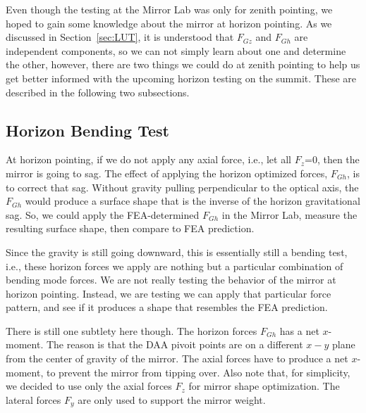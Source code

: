\documentclass [twoside,openbib,12pt]{article}
\begin{document}
Even though the testing at the Mirror Lab was only for zenith
pointing, we hoped to gain some knowledge about the mirror at horizon
pointing. As we discussed in Section~\ref{sec:LUT}, it is understood
that $F_{Gz}$ and $F_{Gh}$ are independent components, so we can not
simply learn about one and determine the other, however, there are two
things we could do at zenith pointing to help us get better informed
with the upcoming horizon testing on the summit. These are described in the
following two subsections.

\subsection{Horizon Bending Test}

 At horizon pointing, if we do not apply any axial force, i.e., let
 all $F_z$=0, then the mirror is going to sag.
The effect of applying the horizon optimized forces, $F_{Gh}$, is to
correct that sag. Without gravity pulling perpendicular to the optical
axis, the $F_{Gh}$ would produce a surface shape that is the inverse
of the horizon gravitational sag. So, we could apply the
FEA-determined $F_{Gh}$ in the Mirror Lab, measure the resulting
surface shape, then compare to FEA prediction.

Since the gravity is still going downward, this is essentially still a
bending test, i.e., these horizon forces we apply are nothing but a
particular combination of bending mode forces. We are not really
testing the behavior of the mirror at horizon pointing. Instead, we
are testing we can apply that particular force pattern, and see if it
produces a shape that resembles the FEA prediction.

There is still one subtlety here though. The horizon forces $F_{Gh}$
has a net $x$-moment. The reason is that the DAA pivoit points are on
a different $x-y$ plane from the center of gravity of the mirror. The
axial forces have to produce a net $x$-moment, to prevent the mirror
from tipping over.
Also note that, for simplicity, we decided to use only the axial
forces $F_z$ for mirror shape optimization. The lateral forces $F_y$ are only used
to support the mirror weight.
\end{document}
